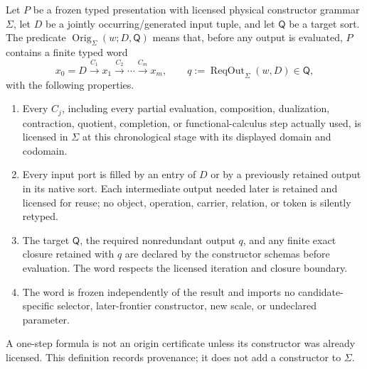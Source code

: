 \documentclass[12pt,a4paper]{article}
\begin{document}
\begin{definition}
\label{p2a:def:frozen-constructor-origin-certificate}
Let \(P\) be a frozen typed presentation with licensed physical constructor
grammar \(\Sigma\), let \(D\) be a jointly occurring/generated input tuple,
and let \(\mathsf Q\) be a target sort.  The predicate
\(\operatorname{Orig}_{\Sigma}(w;D,\mathsf Q)\) means that, before any output
is evaluated, \(P\) contains a finite typed word
\[
 x_0=D\xrightarrow{C_1}x_1\xrightarrow{C_2}\cdots
 \xrightarrow{C_m}x_m,
 \qquad q:=\operatorname{ReqOut}_{\Sigma}(w,D)\in\mathsf Q,
\]
with the following properties.
\begin{enumerate}[label=(\roman*),leftmargin=2em]
\item Every \(C_j\), including every partial evaluation, composition,
      dualization, contraction, quotient, completion, or functional-calculus
      step actually used, is licensed in \(\Sigma\) at this chronological
      stage with its displayed domain and codomain.
\item Every input port is filled by an entry of \(D\) or by a previously
      retained output in its native sort.  Each intermediate output needed
      later is retained and licensed for reuse; no object, operation, carrier,
      relation, or token is silently retyped.
\item The target \(\mathsf Q\), the required nonredundant output \(q\), and any
      finite exact closure retained with \(q\) are declared by the constructor
      schemas before evaluation.  The word respects the licensed iteration and
      closure boundary.
\item The word is frozen independently of the result and imports no
      candidate-specific selector, later-frontier constructor, new scale, or
      undeclared parameter.
\end{enumerate}
A one-step formula is not an origin certificate unless its constructor was
already licensed.  This definition records provenance; it does not add a
constructor to \(\Sigma\).
\end{definition}
\end{document}
